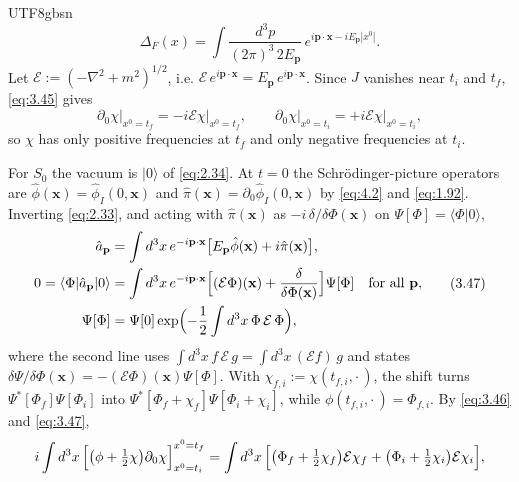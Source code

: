 \documentclass[11pt,a4paper,oneside]{report}
\begin{document}
\begin{CJK*}{UTF8}{gbsn}
\begin{equation*}
\Delta_F(x)=\int\frac{d^3p}{(2\pi)^3\,2E_{\mathbf p}}\,e^{i\mathbf p\cdot\mathbf x-iE_{\mathbf p}|x^0|}.
\tag{3.45}\label{eq:3.45}
\end{equation*}
Let $\mathcal E:=(-\nabla^2+m^2)^{1/2}$, i.e. $\mathcal E\,e^{i\mathbf p\cdot\mathbf x}=E_{\mathbf p}\,e^{i\mathbf p\cdot\mathbf x}$. Since $J$ vanishes near $t_i$ and $t_f$, \eqref{eq:3.45} gives
\begin{equation*}
\partial_0\chi\big|_{x^0=t_f}=-i\mathcal E\chi\big|_{x^0=t_f},\qquad
\partial_0\chi\big|_{x^0=t_i}=+i\mathcal E\chi\big|_{x^0=t_i},
\tag{3.46}\label{eq:3.46}
\end{equation*}
so $\chi$ has only positive frequencies at $t_f$ and only negative frequencies at $t_i$.

For $S_0$ the vacuum is $|0\rangle$ of \eqref{eq:2.34}. At $t=0$ the Schrödinger-picture operators are $\hat\phi(\mathbf x)=\hat\phi_I(0,\mathbf x)$ and $\hat\pi(\mathbf x)=\partial_0\hat\phi_I(0,\mathbf x)$ by \eqref{eq:4.2} and \eqref{eq:1.92}. Inverting \eqref{eq:2.33}, and acting with $\hat\pi(\mathbf x)$ as $-i\,\delta/\delta\Phi(\mathbf x)$ on $\Psi[\Phi]=\langle\Phi|0\rangle$,
\begin{equation*}
\begin{aligned}
\hat a_{\mathbf p}&=\int d^3x\,e^{-i\mathbf p\cdot\mathbf x}\bigl[E_{\mathbf p}\hat\phi(\mathbf x)+i\hat\pi(\mathbf x)\bigr],\\
0=\langle\Phi|\hat a_{\mathbf p}|0\rangle&=\int d^3x\,e^{-i\mathbf p\cdot\mathbf x}\Bigl[(\mathcal E\Phi)(\mathbf x)+\frac{\delta}{\delta\Phi(\mathbf x)}\Bigr]\Psi[\Phi]\quad\text{for all }\mathbf p,\\
\Psi[\Phi]&=\Psi[0]\exp\Bigl(-\frac12\int d^3x\,\Phi\,\mathcal E\,\Phi\Bigr),
\end{aligned}
\tag{3.47}\label{eq:3.47}
\end{equation*}
where the second line uses $\int d^3x\,f\,\mathcal E\,g=\int d^3x\,(\mathcal Ef)\,g$ and states $\delta\Psi/\delta\Phi(\mathbf x)=-(\mathcal E\Phi)(\mathbf x)\Psi[\Phi]$. With $\chi_{f,i}:=\chi(t_{f,i},\cdot\,)$, the shift turns $\Psi^*[\Phi_f]\Psi[\Phi_i]$ into $\Psi^*[\Phi_f+\chi_f]\Psi[\Phi_i+\chi_i]$, while $\phi(t_{f,i},\cdot\,)=\Phi_{f,i}$. By \eqref{eq:3.46} and \eqref{eq:3.47},
\begin{equation*}
\begin{aligned}
i\int d^3x\,\Bigl[\bigl(\phi+\tfrac12\chi\bigr)\partial_0\chi\Bigr]_{x^0=t_i}^{x^0=t_f}
&=\int d^3x\,\Bigl[\bigl(\Phi_f+\tfrac12\chi_f\bigr)\mathcal E\chi_f+\bigl(\Phi_i+\tfrac12\chi_i\bigr)\mathcal E\chi_i\Bigr],\\

\end{aligned}
\end{equation*}
\end{CJK*}
\end{document}
